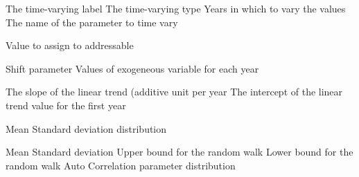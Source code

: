  {The time-varying label}
 {The time-varying type}
 {Years in which to vary the values}
 {The name of the parameter to time vary}
\par\textbf{}\par
{} {}
 {}
 {}
 {}
 {}
\par\textbf{}\par
{} {Value to assign to addressable}
\par\textbf{}\par
{} {Shift parameter}
 {Values of exogeneous variable for each year}
\par\textbf{}\par
{} {The slope of the linear trend (additive unit per year}
 {The intercept of the linear trend value for the first year}
\par\textbf{}\par
{} {Mean}
 {Standard deviation}
 {distribution}
\par\textbf{}\par
{} {Mean}
 {Standard deviation}
 {Upper bound for the random walk}
 {Lower bound for the random walk}
 {Auto Correlation parameter}
 {distribution}
